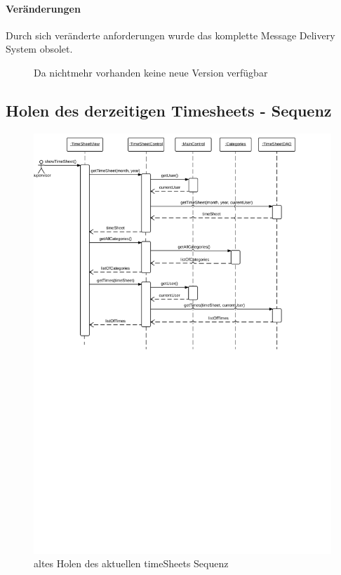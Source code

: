             \paragraph{Veränderungen}
                Durch sich veränderte anforderungen wurde das komplette Message Delivery System obsolet.
            \begin{figure}
              \centering
               \caption{Da nichtmehr vorhanden keine neue Version verfügbar}
            \end{figure}


        \subsection{Holen des derzeitigen Timesheets - Sequenz}
            \begin{figure}
              \centering
                \includegraphics[width=\linewidth]{Get-current-timesheet.pdf}
               \caption{altes Holen des aktuellen timeSheets Sequenz}
            \end{figure}

